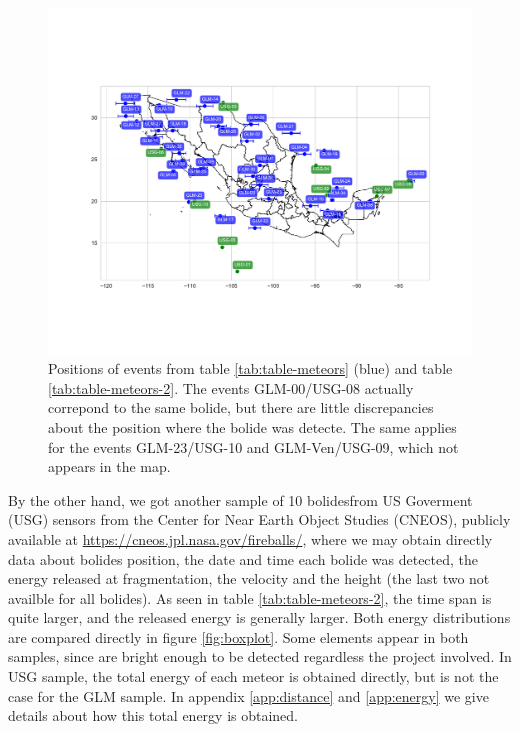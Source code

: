 \begin{figure}
  \centering
  \includegraphics[width=\linewidth]{../meteors_map}
  \caption{Positions of events from table \ref{tab:table-meteors} (blue) and table \ref{tab:table-meteors-2}. The events GLM-00/USG-08 actually correpond to the same bolide, but there are little discrepancies about the position where the bolide was detecte. The same applies for the events GLM-23/USG-10 and GLM-Ven/USG-09, which not appears in the map.}
  \label{fig:meteors-map}
\end{figure}

By the other hand, we got another sample of 10 bolidesfrom US Goverment (USG) sensors from the Center for Near Earth Object Studies (CNEOS), publicly available at \url{https://cneos.jpl.nasa.gov/fireballs/}, where we may obtain directly data about bolides position, the date and time each bolide was detected, the energy released at fragmentation, the velocity and the height (the last two not availble for all bolides). As seen in table \ref{tab:table-meteors-2}, the time span is quite larger, and the released energy is generally larger. Both energy distributions are compared directly in figure \ref{fig:boxplot}. Some elements appear in both samples, since are bright enough to be detected regardless the project involved. In USG sample, the total energy of each meteor is obtained directly, but is not the case for the GLM sample. In appendix \ref{app:distance} and \ref{app:energy} we give details about how this total energy is obtained.


